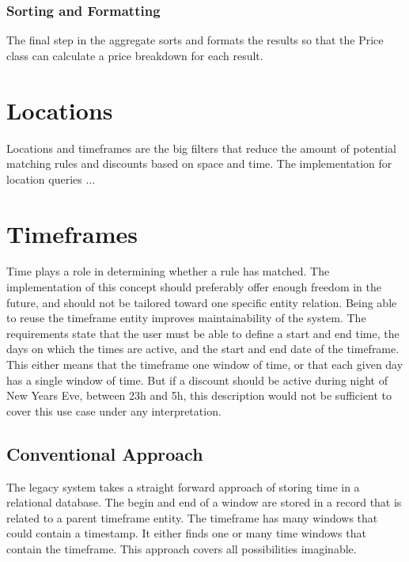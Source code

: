 \subsubsection{Sorting and Formatting}
The final step in the aggregate sorts and formats the results so that the Price class can calculate a price breakdown for each result.


\section{Locations}
Locations and timeframes are the big filters that reduce the amount of potential matching rules and discounts based on space and time. The implementation for location queries ...


\section{Timeframes}
Time plays a role in determining whether a rule has matched. The implementation of this concept should preferably offer enough freedom in the future, and should not be tailored toward one specific entity relation. Being able to reuse the timeframe entity improves maintainability of the system. The requirements state that the user must be able to define a start and end time, the days on which the times are active, and the start and end date of the timeframe. This either means that the timeframe one window of time, or that each given day has a single window of time. But if a discount should be active during night of New Years Eve, between 23h and 5h, this description would not be sufficient to cover this use case under any interpretation.

\subsection{Conventional Approach}
The legacy system takes a straight forward approach of storing time in a relational database. The begin and end of a window are stored in a record that is related to a parent timeframe entity. The timeframe has many windows that could contain a timestamp. It either finds one or many time windows that contain the timeframe. This approach covers all possibilities imaginable.

